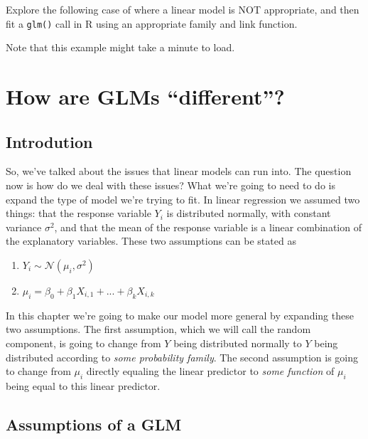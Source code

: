 \documentclass[
]{book}
\providecommand{\tightlist}{%
  \setlength{\itemsep}{0pt}\setlength{\parskip}{0pt}}
\begin{document}
Explore the following case of where a linear model is NOT appropriate, and then fit a \texttt{glm()} call in R using an appropriate family and link function.

Note that this example might take a minute to load.

\hypertarget{how-are-glms-different}{%
\chapter{How are GLMs ``different''?}\label{how-are-glms-different}}

\hypertarget{introdution}{%
\section{Introdution}\label{introdution}}

So, we've talked about the issues that linear models can run into. The question now is how do we deal with these issues? What we're going to need to do is expand the type of model we're trying to fit. In linear regression we assumed two things: that the response variable \(Y_i\) is distributed normally, with constant variance \(\sigma^2\), and that the mean of the response variable is a linear combination of the explanatory variables. These two assumptions can be stated as

\begin{enumerate}
\def\labelenumi{\arabic{enumi}.}
\tightlist
\item
  \(Y_i \sim \mathcal{N}(\mu_i,\sigma^2)\)
\item
  \(\mu_i = \beta_0 + \beta_{1}X_{i,1}+...+\beta_{k}X_{i,k}\)
\end{enumerate}

In this chapter we're going to make our model more general by expanding these two assumptions. The first assumption, which we will call the random component, is going to change from \(Y\) being distributed normally to \(Y\) being distributed according to \emph{some probability family}. The second assumption is going to change from \(\mu_i\) directly equaling the linear predictor to \emph{some function} of \(\mu_i\) being equal to this linear predictor.

\hypertarget{assumptions-of-a-glm}{%
\section{Assumptions of a GLM}\label{assumptions-of-a-glm}}
\end{document}
